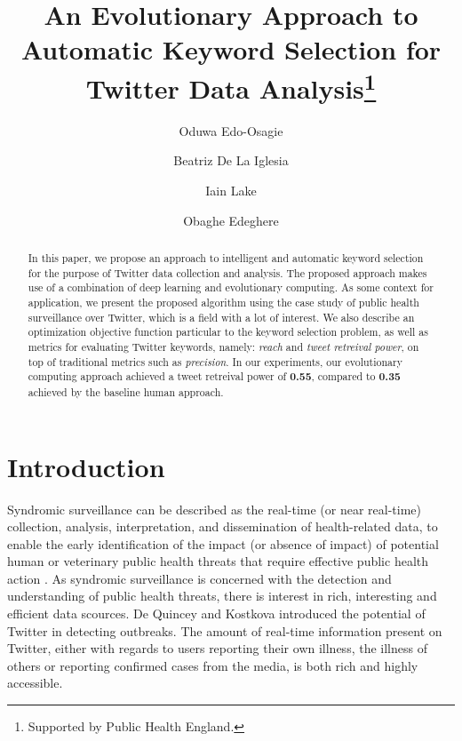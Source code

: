 \documentclass[runningheads]{llncs}
\begin{document}
%
\title{An Evolutionary Approach to Automatic Keyword Selection for Twitter Data Analysis\thanks{Supported by Public Health England.}}
%
%
\author{Oduwa Edo-Osagie \and Beatriz De La Iglesia \and Iain Lake \and Obaghe Edeghere }
%


\maketitle              %
%
\begin{abstract}
In this paper, we propose an approach to intelligent and automatic keyword selection for the purpose of Twitter data collection and analysis. The proposed approach makes use of a combination of deep learning and evolutionary computing. As some context for application, we present the proposed algorithm using the case study of public health surveillance over Twitter, which is a field with a lot of interest. We also describe an optimization objective function particular to the keyword selection problem, as well as metrics for evaluating Twitter keywords, namely: \textit{reach} and \textit{tweet retreival power}, on top of traditional metrics such as \textit{precision}. In our experiments, our evolutionary computing approach achieved a tweet retreival power of \textbf{0.55}, compared to \textbf{0.35} achieved by the baseline human approach.

\end{abstract}
%
%
%
\section{Introduction}\label{Intro}
Syndromic surveillance can be described as the real-time (or near real-time) collection, analysis, interpretation, and dissemination of health-related data, to enable the early identification of the impact (or absence of impact) of potential human or veterinary public health threats that require effective public health action \cite{I_REF11}. As syndromic surveillance is concerned with the detection and understanding of public health threats, there is interest in rich, interesting and efficient data scources. De Quincey  and Kostkova \cite{I_REF15} introduced the potential of Twitter in detecting outbreaks. The amount of real-time information present on Twitter, either with regards to users reporting their own illness, the illness of others or reporting confirmed cases from the media, is both rich and highly accessible.
\end{document}
